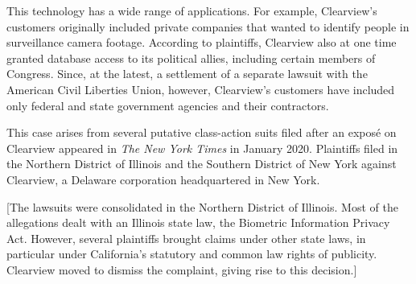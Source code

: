 This technology has a wide range of applications. For example, Clearview's
customers originally included private companies that wanted to identify people
in surveillance camera footage. According to plaintiffs, Clearview also at one
time granted database access to its political allies, including certain members
of Congress. Since, at the latest, a settlement of a separate lawsuit with the
American Civil Liberties Union, however, Clearview's customers have included
only federal and state government agencies and their contractors.


This case arises from several putative class-action suits filed after an
expos\'{e} on Clearview appeared in \emph{The New York Times} in January
2020. Plaintiffs filed in
the Northern District of Illinois and the Southern District of New York against
Clearview, a Delaware corporation headquartered in New York.


[The lawsuits were consolidated in the Northern District of Illinois.
Most of the allegations dealt with an Illinois state law, the Biometric
Information Privacy Act. However, several plaintiffs brought claims under other
state laws, in particular under California's statutory and common law rights of
publicity. Clearview moved to dismiss the complaint, giving rise to this
decision.]

